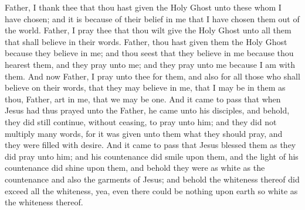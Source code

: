 Father, I thank thee that thou hast given the Holy Ghost unto these whom I have chosen; and it is because of their belief in me that I have chosen them out of the world.
\bverse \iffalse Father, I pray thee that thou wilt give the Holy Ghost unto all them that shall believe in their words. \fi
Father, I pray thee that thou wilt give the Holy Ghost unto all them that shall believe in their words.
\bverse \iffalse Father, thou hast given them the Holy Ghost because they believe in me; and thou seest that they believe in me because thou hearest them, and they pray unto me; and they pray unto me because I am with them. \fi
Father, thou hast given them the Holy Ghost because they believe in me; and thou seest that they believe in me because thou hearest them, and they pray unto me; and they pray unto me because I am with them.
\bverse \iffalse And now Father, I pray unto thee for them, and also for all those who shall believe on their words, that they may believe in me, that I may be in them as thou, Father, art in me, that we may be one. \fi
And now Father, I pray unto thee for them, and also for all those who shall believe on their words, that they may believe in me, that I may be in them as thou, Father, art in me, that we may be one.
\bverse \iffalse And it came to pass that when Jesus had thus prayed unto the Father, he came unto his disciples, and behold, they did still continue, without ceasing, to pray unto him; and they did not multiply many words, for it was given unto them what they should pray, and they were filled with desire. \fi
And it came to pass that when Jesus had thus prayed unto the Father, he came unto his disciples, and behold, they did still continue, without ceasing, to pray unto him; and they did not multiply many words, for it was given unto them what they should pray, and they were filled with desire.
\bverse \iffalse And it came to pass that Jesus blessed them as they did pray unto him; and his countenance did smile upon them, and the light of his countenance did shine upon them, and behold they were as white as the countenance and also the garments of Jesus; and behold the whiteness thereof did exceed all the whiteness, yea, even there could be nothing upon earth so white as the whiteness thereof. \fi
And it came to pass that Jesus blessed them as they did pray unto him; and his countenance did smile upon them, and the light of his countenance did shine upon them, and behold they were as white as the countenance and also the garments of Jesus; and behold the whiteness thereof did exceed all the whiteness, yea, even there could be nothing upon earth so white as the whiteness thereof.
